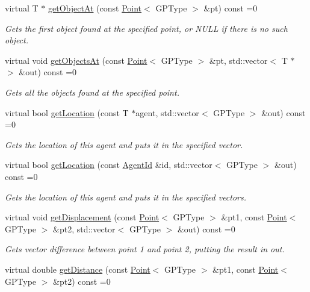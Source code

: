 \begin{DoxyCompactItemize}
\item 
virtual T $\ast$ \hyperlink{classrepast_1_1_grid_a8b77b072353aed6f06b6d02e21ee9879}{get\-Object\-At} (const \hyperlink{classrepast_1_1_point}{Point}$<$ G\-P\-Type $>$ \&pt) const =0
\begin{DoxyCompactList}\small\item\em Gets the first object found at the specified point, or N\-U\-L\-L if there is no such object. \end{DoxyCompactList}\item 
virtual void \hyperlink{classrepast_1_1_grid_aaa3a1fd92707079f7dd4805e36ca83ff}{get\-Objects\-At} (const \hyperlink{classrepast_1_1_point}{Point}$<$ G\-P\-Type $>$ \&pt, std\-::vector$<$ T $\ast$ $>$ \&out) const =0
\begin{DoxyCompactList}\small\item\em Gets all the objects found at the specified point. \end{DoxyCompactList}\item 
virtual bool \hyperlink{classrepast_1_1_grid_a159a33da91ef58dbd8ca88829d82ca36}{get\-Location} (const T $\ast$agent, std\-::vector$<$ G\-P\-Type $>$ \&out) const =0
\begin{DoxyCompactList}\small\item\em Gets the location of this agent and puts it in the specified vector. \end{DoxyCompactList}\item 
virtual bool \hyperlink{classrepast_1_1_grid_a6fef590f66b69e4a06207df59d1b2737}{get\-Location} (const \hyperlink{classrepast_1_1_agent_id}{Agent\-Id} \&id, std\-::vector$<$ G\-P\-Type $>$ \&out) const =0
\begin{DoxyCompactList}\small\item\em Gets the location of this agent and puts it in the specified vectors. \end{DoxyCompactList}\item 
virtual void \hyperlink{classrepast_1_1_grid_a23236c2387ba343121dbf71901dbb341}{get\-Displacement} (const \hyperlink{classrepast_1_1_point}{Point}$<$ G\-P\-Type $>$ \&pt1, const \hyperlink{classrepast_1_1_point}{Point}$<$ G\-P\-Type $>$ \&pt2, std\-::vector$<$ G\-P\-Type $>$ \&out) const =0
\begin{DoxyCompactList}\small\item\em Gets vector difference between point 1 and point 2, putting the result in out. \end{DoxyCompactList}\item 
virtual double \hyperlink{classrepast_1_1_grid_a27213b5f9decf10e1c99a5a7b4ae387a}{get\-Distance} (const \hyperlink{classrepast_1_1_point}{Point}$<$ G\-P\-Type $>$ \&pt1, const \hyperlink{classrepast_1_1_point}{Point}$<$ G\-P\-Type $>$ \&pt2) const =0

\end{DoxyCompactItemize}
